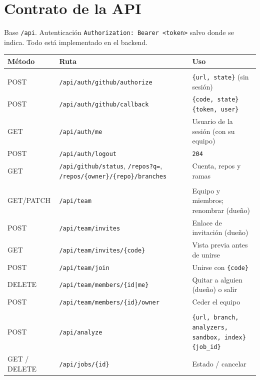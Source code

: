 \documentclass[11pt,a4paper]{article}
\newcommand{\code}[1]{\texttt{\small #1}}
\newcommand{\ruta}[1]{\texttt{\small\color{branddark}#1}}
\newcommand{\flecha}{\textrightarrow{}}
\begin{document}
\section{Contrato de la API}

Base \code{/api}. Autenticación \code{Authorization: Bearer <token>} salvo donde se indica. Todo está implementado en
el backend.

\begin{longtable}{@{}>{\raggedright\arraybackslash}p{1.9cm}>{\raggedright\arraybackslash}p{6.5cm}>{\raggedright\arraybackslash}p{6.7cm}@{}}
\toprule
\textbf{Método} & \textbf{Ruta} & \textbf{Uso} \\
\midrule
\endhead
\multicolumn{3}{@{}l}{\textbf{\color{branddark}Autenticación y GitHub}} \\
POST & \ruta{/api/auth/github/authorize} & \code{\{url, state\}} (sin sesión) \\
POST & \ruta{/api/auth/github/callback} & \code{\{code, state\}} \flecha{} \code{\{token, user\}} \\
GET & \ruta{/api/auth/me} & Usuario de la sesión (con su equipo) \\
POST & \ruta{/api/auth/logout} & \code{204} \\
GET & \ruta{/api/github/status}, \ruta{/repos?q=}, \ruta{/repos/\{owner\}/\{repo\}/branches} & Cuenta, repos y ramas \\
\multicolumn{3}{@{}l}{\textbf{\color{branddark}Equipo}} \\
GET/PATCH & \ruta{/api/team} & Equipo y miembros; renombrar (dueño) \\
POST & \ruta{/api/team/invites} & Enlace de invitación (dueño) \\
GET & \ruta{/api/team/invites/\{code\}} & Vista previa antes de unirse \\
POST & \ruta{/api/team/join} & Unirse con \code{\{code\}} \\
DELETE & \ruta{/api/team/members/\{id|me\}} & Quitar a alguien (dueño) o salir \\
POST & \ruta{/api/team/members/\{id\}/owner} & Ceder el equipo \\
\multicolumn{3}{@{}l}{\textbf{\color{branddark}Análisis}} \\
POST & \ruta{/api/analyze} & \code{\{url, branch, analyzers, sandbox, index\}} \flecha{} \code{\{job\_id\}} \\
GET / DELETE & \ruta{/api/jobs/\{id\}} & Estado / cancelar \\

\end{longtable}
\end{document}
